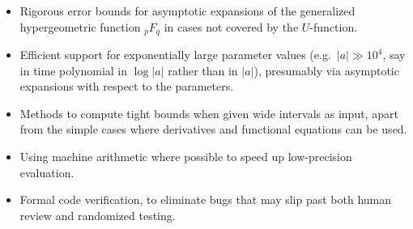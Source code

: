 \documentclass[11pt,a4paper]{article}
\begin{document}
\begin{itemize}
\item Rigorous error bounds for asymptotic expansions
of the generalized hypergeometric function ${}_pF_q$ in cases
not covered by the $U$-function.
\item Efficient support for exponentially large parameter values (e.g.\ $|a| \gg 10^4$, say
in time polynomial in $\log |a|$ rather than in $|a|$), presumably
via asymptotic expansions with respect to the parameters.
\item Methods to compute tight bounds when given wide intervals as input,
apart from the simple cases where derivatives and functional
equations can be used.
\item Using machine arithmetic where possible to speed up low-precision evaluation.
\item Formal code verification, to eliminate bugs that
may slip past both human review and randomized testing.
\end{itemize}




\end{document}
